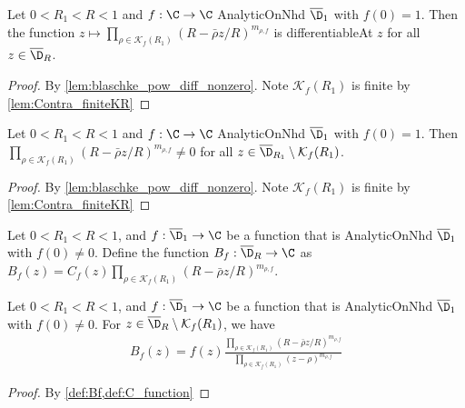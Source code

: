 \begin{lemma}\label{lem:bl_num_diff}  \leanok
Let $0<R_1<R<1$ and $f:\C\to\C$ AnalyticOnNhd $\overline{\D}_1$ with $f(0)=1$. Then the function $z \mapsto \prod_{\rho\in \mathcal K_f(R_1)} (R-\bar\rho z/R)^{m_{\rho,f}}$ is differentiableAt $z$ for all $z\in \overline{\D}_{R}$.
\end{lemma}
\begin{proof} \leanok
{}
By \cref{lem:blaschke_pow_diff_nonzero}. Note $\mathcal K_f(R_1)$ is finite by \cref{lem:Contra_finiteKR}
\end{proof}


\begin{lemma}\label{lem:bl_num_nonzero} \leanok {}
Let $0<R_1<R<1$ and $f:\C\to\C$ AnalyticOnNhd $\overline{\D}_1$ with $f(0)=1$. Then $\prod_{\rho\in \mathcal K_f(R_1)} (R-\bar\rho z/R)^{m_{\rho,f}}\neq0$ for all $z\in \overline{\D}_{R_1}\setminus\mathcal K_f(R_1)$.
\end{lemma}
\begin{proof}
\leanok
By \cref{lem:blaschke_pow_diff_nonzero}. Note $\mathcal K_f(R_1)$ is finite by \cref{lem:Contra_finiteKR}
\end{proof}

\begin{definition}[Blaschke B] \label{def:Bf}   \leanok
Let $0<R_1<R<1$, and $f:\overline{\D}_1\to\C$ be a function that is AnalyticOnNhd $\overline{\D}_1$ with $f(0)\neq0$. Define the function $B_f:\overline{\D}_R\to\C$ as $B_f(z)=C_f(z)\prod_{\rho\in \mathcal K_f(R_1)} (R-\bar\rho z/R)^{m_{\rho,f}}$.
\end{definition}

\begin{lemma} \label{lem:BfCf}  \leanok
Let $0<R_1<R<1$, and $f:\overline{\D}_1\to\C$ be a function that is AnalyticOnNhd $\overline{\D}_1$ with $f(0)\neq0$. For $z\in \overline{\D}_R\setminus\mathcal K_f(R_1)$, we have
\begin{align*}
B_f(z)= f(z) \frac{\prod_{\rho\in \mathcal K_f(R_1)} (R-\bar\rho z/R)^{m_{\rho,f}}}{\prod_{\rho\in \mathcal K_f(R_1)} (z-\rho)^{m_{\rho,f}}}
\end{align*}
\end{lemma}
\begin{proof}
\leanok
By \cref{def:Bf,def:C_function}
\end{proof}


